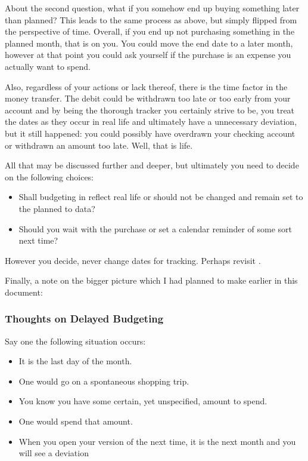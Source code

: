 About the second question, what if you somehow end up buying something later than planned?
This leads to the same process as above, but simply flipped from the perspective of time.
Overall, if you end up not purchasing something in the planned month, that is on you.
You could move the end date to a later month, however at that point you could ask yourself if the purchase is an expense you actually want to spend.

Also, regardless of your actions or lack thereof, there is the time factor in the money transfer.
The debit could be withdrawn too late or too early from your account and by being the thorough tracker you certainly strive to be, you treat the dates as they occur in real life and ultimately have a unnecessary deviation, but it still happened: you could possibly have overdrawn your checking account or withdrawn an amount too late.
Well, that is life.

All that may be discussed further and deeper, but ultimately you need to decide on the following choices:
\begin{itemize}
	\item Shall budgeting in \tfn reflect real life or should \tfn not be changed and remain set to the planned to data?
	\item Should you wait with the purchase or set a calendar reminder of some sort next time?
\end{itemize}
\begin{specialnote}
	However you decide, never change dates for tracking.
	Perhaps revisit .
\end{specialnote}

Finally, a note on the bigger picture which I had planned to make earlier in this document:

\subsubsection{Thoughts on Delayed Budgeting}
\label{subsubsec:thoughts-delayed-budgeting}

Say one the following situation occurs:
\begin{itemize}
	\item It is the last day of the month.
	\item One would go on a spontaneous shopping trip.
	\item You know you have some certain, yet unspecified, amount to spend.
	\item One would spend that amount.
	\item When you open your version of \tfn the next time, it is the next month and you will see a deviation
\end{itemize}

